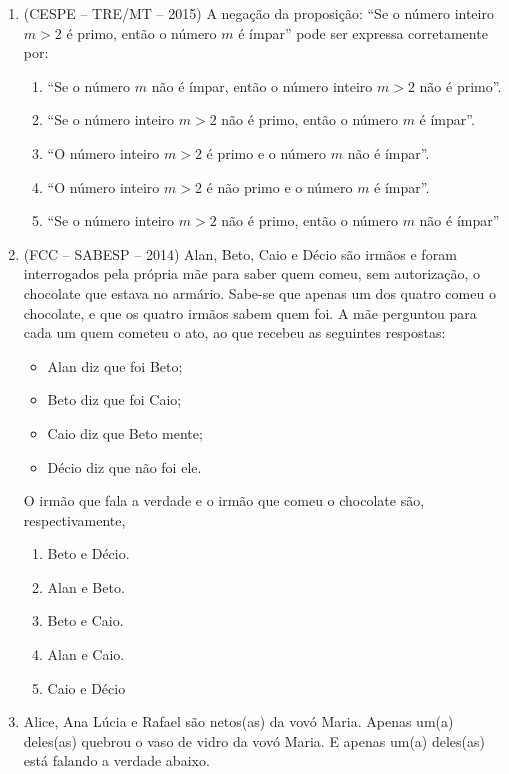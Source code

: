 \documentclass[12pt,a4paper]{article}
\begin{document}
\begin{enumerate}
  \item (CESPE – TRE/MT – 2015) A negação da proposição: ``Se o número
    inteiro $m > 2$ é primo, então o número $m$ é ímpar'' pode ser expressa
    corretamente por:

    \begin{enumerate}
      \item ``Se o número $m$ não é ímpar, então o número inteiro $m > 2$ não é primo''.
      \item ``Se o número inteiro $m > 2$ não é primo, então o número $m$ é ímpar''.
      \item ``O número inteiro $m > 2$ é primo e o número $m$ não é ímpar''.
      \item ``O número inteiro $m > 2$ é não primo e o número $m$ é ímpar''.
      \item ``Se o número inteiro $m > 2$ não é primo, então o número $m$ não é ímpar''
    \end{enumerate}
    
  \item (FCC – SABESP – 2014) Alan, Beto, Caio e Décio são irmãos e foram
    interrogados pela própria mãe para saber quem comeu, sem autorização,
    o chocolate que estava no armário. Sabe-se que apenas um dos quatro
    comeu o chocolate, e que os quatro irmãos sabem quem foi. A mãe
    perguntou para cada um quem cometeu o ato, ao que recebeu as seguintes
    respostas:

    \begin{itemize}   
      \item Alan diz que foi Beto;
      \item Beto diz que foi Caio;
      \item Caio diz que Beto mente;
      \item Décio diz que não foi ele.
    \end{itemize}

    O irmão que fala a verdade e o irmão que comeu o chocolate são,
    respectivamente,

    \begin{enumerate}
      \item Beto e Décio.
      \item Alan e Beto.
      \item Beto e Caio.
      \item Alan e Caio.
      \item Caio e Décio
    \end{enumerate}
        
        
    \item Alice, Ana Lúcia e Rafael são netos(as) da vovó Maria. Apenas 
    um(a) deles(as) quebrou o vaso de vidro da vovó Maria. E apenas um(a) 
    deles(as) está falando a verdade abaixo.


\end{enumerate}
\end{document}
